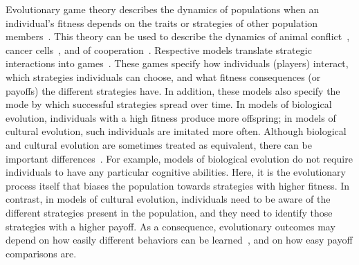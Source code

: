 \documentclass[11pt]{article}
\theoremstyle{plainCl1}
\theoremstyle{plainCl2}
\begin{document}
Evolutionary game theory describes the dynamics of populations when an individual's fitness depends on the traits or strategies of other population members~\cite{hofbauer1998evolutionary, nowak:Nature:2004, hauert2005game,Traulsen:PhilTrans:2022}.  
This theory can be used to describe the dynamics of animal conflict~\citep{maynard-smith:Nature:1973}, cancer cells~\citep{Stein:PTRS:2023}, and of cooperation~\citep{nowak:Science:2006}. 
Respective models translate strategic interactions into games~\cite{smith1982evolution}. 
These games specify how individuals (players) interact, which strategies individuals can choose, and what fitness consequences (or payoffs) the different strategies have. 
In addition, these models also specify the mode by which successful strategies spread over time. 
In models of biological evolution, individuals with a high fitness produce more offspring; in models of cultural evolution, such individuals are imitated more often. 
Although biological and cultural evolution are sometimes treated as equivalent, there can be important differences~\citep{Wu2015,Smolla:PTRS:2021}. 
For example, models of biological evolution do not require individuals to have any particular cognitive abilities.
Here, it is the evolutionary process itself that biases the population towards strategies with higher fitness. 
In contrast, in models of cultural evolution, individuals need to be aware of the different strategies present in the population, and they need to identify those strategies with a higher payoff. 
As a consequence, evolutionary outcomes may depend on how easily different behaviors can be learned~\citep{Chatterjee:JTB:2012}, and on how easy payoff comparisons are. 

\end{document}
